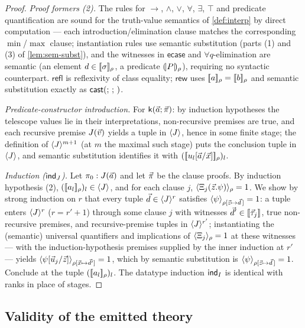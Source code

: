 \begin{proof}
\emph{Proof formers (2).}  The rules for $\to$, $\wedge$, $\vee$,
$\forall$, $\exists$, $\top$ and predicate quantification are sound for
the truth-value semantics of \cref{def:interp} by direct computation ---
each introduction/elimination clause matches the corresponding
$\min$/$\max$ clause; instantiation rules use semantic substitution
(parts (1) and (3) of \cref{lem:sem-subst}), and the witnesses in
$\mathsf{ecase}$ and $\forall q$-elimination are semantic (an element $d
\in [\![ \sigma ]\!]_{\rho}$, a predicate $(\!| P |\!)_{\rho}$), requiring no
syntactic counterpart.  $\mathsf{refl}$ is reflexivity of class
equality; $\mathsf{rew}$ uses $[\![ a ]\!]_\rho = [\![ b ]\!]_\rho$ and semantic
substitution exactly as $\mathsf{cast}(;\,;\,)$.

\emph{Predicate-constructor introduction.}  For
$\mathsf{k}(\vec{a};\vec{\pi})$: by induction hypotheses the telescope
values lie in their interpretations, non-recursive premises are true, and
each recursive premise $J(\vec{v})$ yields a tuple in $\langle J \rangle$, hence in
some finite stage; the definition of $\langle J \rangle^{m+1}$ (at $m$ the maximal
such stage) puts the conclusion tuple in $\langle J \rangle$, and semantic
substitution identifies it with $([\![ u_l[\vec{a}/\vec{x}] ]\!]_\rho)_l$.

\emph{Induction ($\mathsf{ind}_{J}$).}  Let $\pi_0 : J(\vec{a})$ and let
$\vec{\pi}$ be the clause proofs.  By induction hypothesis (2),
$([\![ a_l ]\!]_\rho)_l \in \langle J \rangle$, and for each clause $j$,
$\langle \Xi_j(\vec{z}.\psi) \rangle_{\rho} = 1$.  We show by strong induction on
$r$ that every tuple $\vec{d} \in \langle J \rangle^{r}$ satisfies
$\langle \psi \rangle_{\rho[\vec{z} \mapsto \vec{d}\,]} = 1$: a tuple enters
$\langle J \rangle^{r}$ ($r = r'+1$) through some clause $j$ with witnesses
$\vec{d}' \in [\![ \vec{\tau}_j ]\!]_{}$, true non-recursive premises, and
recursive-premise tuples in $\langle J \rangle^{r'}$; instantiating the (semantic)
universal quantifiers and implications of $\langle \Xi_j \rangle_{\rho} = 1$ at
these witnesses --- with the induction-hypothesis premises supplied by
the inner induction at $r'$ --- yields
$\langle \psi[\vec{u}_j/\vec{z}] \rangle_{\rho[\vec{x} \mapsto
\vec{d}']} = 1$, which by semantic substitution is
$\langle \psi \rangle_{\rho[\vec{z} \mapsto \vec{d}\,]} = 1$.  Conclude at the tuple
$([\![ a_l ]\!]_\rho)_l$.  The datatype induction $\mathsf{ind}_{I}$ is identical
with ranks in place of stages.
\end{proof}

\subsection{Validity of the emitted theory}

